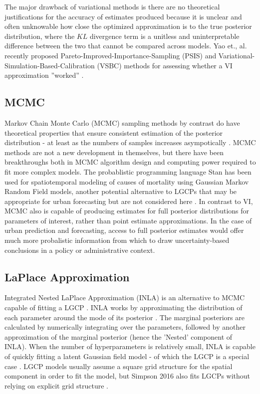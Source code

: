 The major drawback of variational methods is there are no theoretical justifications for the accuracy of estimates produced because it is unclear and often unknowable how close the optimized approximation is to the true posterior distribution, where the $KL$ divergence term is a unitless and uninterpretable difference between the two that cannot be compared across models. Yao et., al. recently proposed Pareto-Improved-Importance-Sampling (PSIS) and Variational-Simulation-Based-Calibration (VSBC) methods for assessing whether a VI approximation ''worked'' \cite{yao_2018}.

\subsection{MCMC}

Markov Chain Monte Carlo (MCMC) sampling methods by contrast do have theoretical properties that ensure consistent estimation of the posterior distribution - at least  as the numbers of samples increases asympotically \cite{teng_2017}. MCMC methods are not a new development in themselves, but there have been breakthroughs both in MCMC algorithm design and computing power required to fit more complex models. The probablistic programming language Stan has been used for spatiotemporal modeling of causes of mortality using Gaussian Markov Random Field models, another potential alternative to LGCPs that may be appropriate for urban forecasting but are not considered here \cite{stan} \cite{foreman_2017}. In contrast to VI, MCMC also is capable of producing estimates for full posterior distributions for parameters of interest, rather than point estimate approximations. In the case of urban prediction and forecasting, access to full posterior estimates would offer much more probalistic information from which to draw uncertainty-based conclusions in a policy or administrative context.

\subsection{LaPlace Approximation}

Integrated Nested LaPlace Approximation (INLA) is an alternative to MCMC capable of fitting a LGCP \cite{illian_toolbox}. INLA works by approximating the distribution of each parameter around the mode of its posterior \cite{lindgren2015bayesian}. The marginal posteriors are calculated by numerically integrating over the parameters, followed by another approximation of the marginal posterior (hence the 'Nested' component of INLA). When the number of hyperparameters is relatively small, INLA is capable of quickly fitting a latent Gaussian field model - of which the LGCP is a special case \cite{rue2009approximate}. LGCP models usually assume a square grid structure for the spatial component in order to fit the model, but Simpson 2016 also fits LGCPs without relying on explicit grid structure \cite{simpson2016going}.


